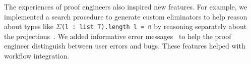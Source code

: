 The experiences of proof engineers also inspired new features.
For example, we implemented a search procedure to generate custom eliminators %
to help reason about types like $\Sigma$\lstinline{(l : list T).length l = n}
by reasoning separately about the projections~\href{https://github.com/uwplse/pumpkin-pi/blob/v2.0.0/plugin/src/automation/search/smartelim.ml}{}. %
We added informative error messages~\href{https://github.com/uwplse/pumpkin-pi/blob/v2.0.0/plugin/src/lib/ornerrors.ml}{} to help the proof engineer distinguish between user errors and bugs. %
These features helped with workflow integration. %

